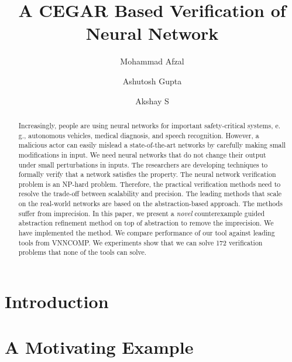 \documentclass[10pt]{llncs}
\title{A CEGAR Based Verification of Neural Network}
\author{Mohammad Afzal\inst{1,2}\and Ashutosh Gupta\inst{1}\and Akshay S\inst{1}}
\institute{Indian Institute of Technology, Bombay, India\and TCS Research, Pune, India}
\begin{document}
\maketitle

\begin{abstract}
  Increasingly, people are using neural networks for important
  safety-critical systems, e. g., autonomous vehicles,
  medical diagnosis, and speech recognition.
  However, a malicious actor can easily
  mislead a state-of-the-art networks
  by carefully making small modifications in input.
  We need neural networks that do not change their output
  under small perturbations in inputs.
  The researchers are developing techniques to formally
  verify that a network satisfies the property.
  The neural network verification problem is an NP-hard problem.
  Therefore, the practical verification methods need to resolve the
  trade-off between scalability and precision.
  The leading methods that scale on the real-world
  networks are based on the abstraction-based approach.
  The methods suffer from imprecision.
  In this paper, %
  we present a {\em novel} counterexample guided abstraction
  refinement method on top of abstraction \deeppoly{} to remove
  the imprecision.  
  We have implemented the method.
  We compare performance of our tool against leading tools from VNNCOMP.
  We experiments show that we can solve 172
  verification problems that none of the tools
  can solve.
\end{abstract}

\section{Introduction}
\label{sec:intro}



\section{A Motivating Example}
\label{sec:motivation}

\end{document}

